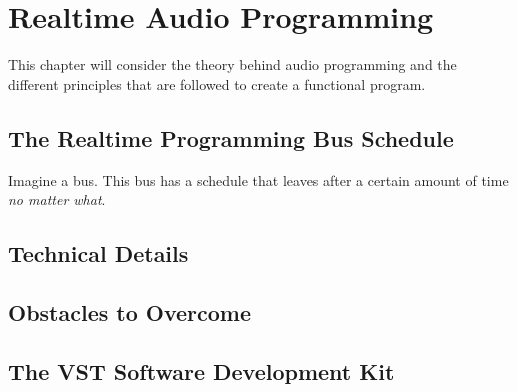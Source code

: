 \chapter{Realtime Audio Programming}
\hspace*{-0.155cm}This chapter will consider the theory behind audio programming and the different principles that are followed to create a functional program.
\section{The Realtime Programming Bus Schedule}
Imagine a bus. This bus has a schedule that leaves after a certain amount of time \textit{no matter what}.
\section{Technical Details}
\section{Obstacles to Overcome}
\section{The VST Software Development Kit}
